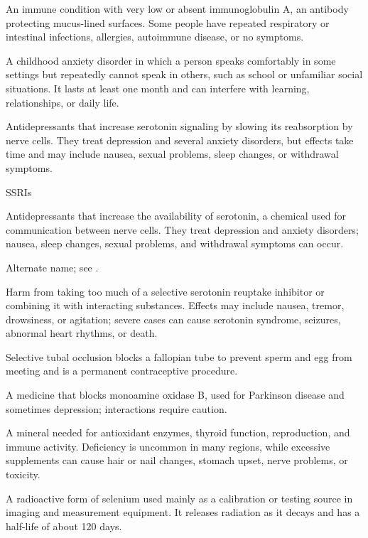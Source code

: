  An immune condition with very low or absent immunoglobulin A, an antibody protecting mucus-lined surfaces. Some people have repeated respiratory or intestinal infections, allergies, autoimmune disease, or no symptoms.

 A childhood anxiety disorder in which a person speaks comfortably in some settings but repeatedly cannot speak in others, such as school or unfamiliar social situations. It lasts at least one month and can interfere with learning, relationships, or daily life.

 Antidepressants that increase serotonin signaling by slowing its reabsorption by nerve cells. They treat depression and several anxiety disorders, but effects take time and may include nausea, sexual problems, sleep changes, or withdrawal symptoms.

\synonyms
SSRIs

 Antidepressants that increase the availability of serotonin, a chemical used for communication between nerve cells. They treat depression and anxiety disorders; nausea, sleep changes, sexual problems, and withdrawal symptoms can occur.

 Alternate name; see .

 Harm from taking too much of a selective serotonin reuptake inhibitor or combining it with interacting substances. Effects may include nausea, tremor, drowsiness, or agitation; severe cases can cause serotonin syndrome, seizures, abnormal heart rhythms, or death.

 Selective tubal occlusion blocks a fallopian tube to prevent sperm and egg from meeting and is a permanent contraceptive procedure.

 A medicine that blocks monoamine oxidase B, used for Parkinson disease and sometimes depression; interactions require caution.

 A mineral needed for antioxidant enzymes, thyroid function, reproduction, and immune activity. Deficiency is uncommon in many regions, while excessive supplements can cause hair or nail changes, stomach upset, nerve problems, or toxicity.

 A radioactive form of selenium used mainly as a calibration or testing source in imaging and measurement equipment. It releases radiation as it decays and has a half-life of about 120 days.

